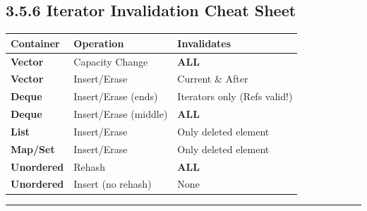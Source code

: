 \hypertarget{iterator-invalidation-cheat-sheet}{%
\subsection{3.5.6 Iterator Invalidation Cheat
Sheet}\label{iterator-invalidation-cheat-sheet}}

\begin{longtable}[]{@{}lll@{}}
\toprule
Container & Operation & Invalidates \\
\midrule
\endhead
\textbf{Vector} & Capacity Change & \textbf{ALL} \\
\textbf{Vector} & Insert/Erase & Current \& After \\
\textbf{Deque} & Insert/Erase (ends) & Iterators only (Refs valid!) \\
\textbf{Deque} & Insert/Erase (middle) & \textbf{ALL} \\
\textbf{List} & Insert/Erase & Only deleted element \\
\textbf{Map/Set} & Insert/Erase & Only deleted element \\
\textbf{Unordered} & Rehash & \textbf{ALL} \\
\textbf{Unordered} & Insert (no rehash) & None \\
\bottomrule
\end{longtable}

\begin{center}\rule{0.5\linewidth}{0.5pt}\end{center}
